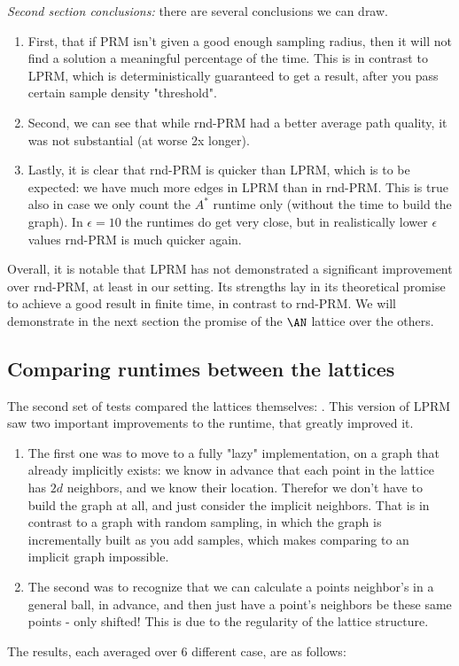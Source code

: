 \emph{Second section conclusions:} there are several conclusions we can draw. 
\begin{enumerate}
    \item First, that if PRM isn't given a good enough sampling radius, then it will not find a solution a meaningful percentage of the time. This is in contrast to LPRM, which is deterministically guaranteed to get a result, after you pass certain sample density "threshold".
    \item Second, we can see that while rnd-PRM had a better average path quality, it was not substantial (at worse 2x longer).
    \item Lastly, it is clear that rnd-PRM is quicker than LPRM, which is to be expected: we have much more edges in LPRM than in rnd-PRM. This is true also in case we only count the $A^*$ runtime only (without the time to build the graph). In $\epsilon=10$ the runtimes do get very close, but in realistically lower $\epsilon$ values rnd-PRM is much quicker again.
\end{enumerate}

Overall, it is notable that LPRM has not demonstrated a significant improvement over rnd-PRM, at least in our setting. Its strengths lay in its theoretical promise to achieve a good result in finite time, in contrast to rnd-PRM. We will demonstrate in the next section the promise of the $\AN$ lattice over the others.

\subsection*{Comparing runtimes between the lattices}
 
 The second set of tests compared the lattices themselves: \Lattices. This version of LPRM saw two important improvements to the runtime, that greatly improved it.
 \begin{enumerate}
     \item The first one was to move to a fully "lazy" implementation, on a graph that already implicitly exists: we know in advance that each point in the lattice has $2d$ neighbors, and we know their location. Therefor we don't have to build the graph at all, and just consider the implicit neighbors. That is in contrast to a graph with random sampling, in which the graph is incrementally built as you add samples, which makes comparing to an implicit graph impossible.
     \item The second was to recognize that we can calculate a points neighbor's in a general ball, in advance, and then just have a point's neighbors be these same points - only shifted! This is due to the regularity of the lattice structure.
 \end{enumerate}
The results, each averaged over 6 different case, are as follows:

